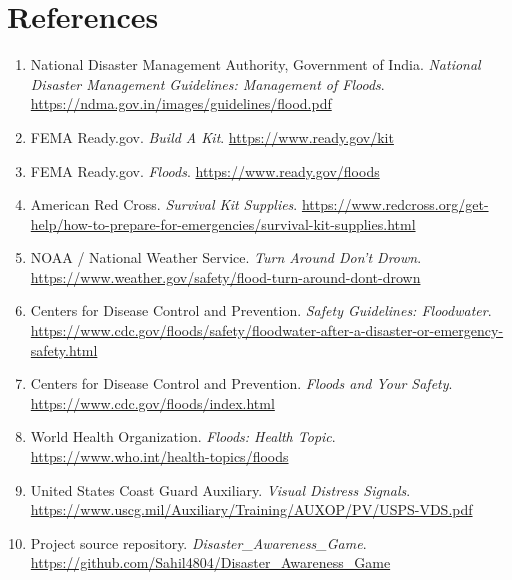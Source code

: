 \documentclass[11pt,a4paper]{article}
\newcommand{\sectionline}{\vspace{0.2em}{\color{ReportBlue}\hrule height 0.8pt}\vspace{0.6em}}
\begin{document}
\section{References}
\sectionline
\begin{enumerate}
  \item National Disaster Management Authority, Government of India. \textit{National Disaster Management Guidelines: Management of Floods}. \url{https://ndma.gov.in/images/guidelines/flood.pdf}
  \item FEMA Ready.gov. \textit{Build A Kit}. \url{https://www.ready.gov/kit}
  \item FEMA Ready.gov. \textit{Floods}. \url{https://www.ready.gov/floods}
  \item American Red Cross. \textit{Survival Kit Supplies}. \url{https://www.redcross.org/get-help/how-to-prepare-for-emergencies/survival-kit-supplies.html}
  \item NOAA / National Weather Service. \textit{Turn Around Don't Drown}. \url{https://www.weather.gov/safety/flood-turn-around-dont-drown}
  \item Centers for Disease Control and Prevention. \textit{Safety Guidelines: Floodwater}. \url{https://www.cdc.gov/floods/safety/floodwater-after-a-disaster-or-emergency-safety.html}
  \item Centers for Disease Control and Prevention. \textit{Floods and Your Safety}. \url{https://www.cdc.gov/floods/index.html}
  \item World Health Organization. \textit{Floods: Health Topic}. \url{https://www.who.int/health-topics/floods}
  \item United States Coast Guard Auxiliary. \textit{Visual Distress Signals}. \url{https://www.uscg.mil/Auxiliary/Training/AUXOP/PV/USPS-VDS.pdf}
  \item Project source repository. \textit{Disaster\_Awareness\_Game}. \url{https://github.com/Sahil4804/Disaster_Awareness_Game}
\end{enumerate}
\end{document}
